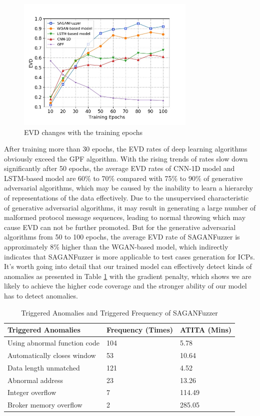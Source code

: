 \begin{figure}[htbp]
	\centering
	\includegraphics[width=3.36in]{FIGURE_EVD.jpg}
	\caption{EVD changes with the training epochs}
	\label{FIGURE_EVD}
\end{figure}
After training more than 30 epochs, the EVD rates of deep learning algorithms obviously exceed the GPF algorithm. With the rising trends of rates slow down significantly after 50 epochs, the average EVD rates of CNN-1D model and LSTM-based model are 60\% to 70\% compared with 75\% to 90\% of generative adversarial algorithms, which may be caused by the inability to learn a hierarchy of representations of the data effectively. Due to the unsupervised characteristic of generative adversarial algorithms, it may result in generating a large number of malformed protocol message sequences, leading to normal throwing which may cause EVD can not be further promoted. But for the generative adversarial algorithms from 50 to 100 epochs, the average EVD rate of SAGANFuzzer is approximately 8\% higher than the WGAN-based model, which indirectly indicates that SAGANFuzzer is more applicable to test cases generation for ICPs. It's worth going into detail that our trained model can effectively detect kinds of anomalies as presented in Table \ref{Triggered_Anomalies_SAGANFuzzer} with the gradient penalty, which shows we are likely to achieve the higher code coverage and the stronger ability of our model has to detect anomalies.
\begin{table}[htbp]
	\caption{Triggered Anomalies and Triggered Frequency of SAGANFuzzer}
	\label{Triggered_Anomalies_SAGANFuzzer}
	\centering
	\begin{tabular}{m{100pt}<{\centering}  m{40pt}<{\centering} m{50pt}<{\centering} }
		\toprule
		\bfseries Triggered Anomalies &  \bfseries Frequency (Times) & \bfseries ATITA (Mins)\\
		\midrule
		Using abnormal function code & 104 & 5.78\\
		Automatically closes window & 53 &10.64\\
		Data length unmatched & 121 & 4.52\\
		Abnormal address & 23 &13.26\\
		Integer overflow & 7 & 114.49 \\
		Broker memory overflow & 2 & 285.05 \\
		\bottomrule
	\end{tabular}
\end{table}


